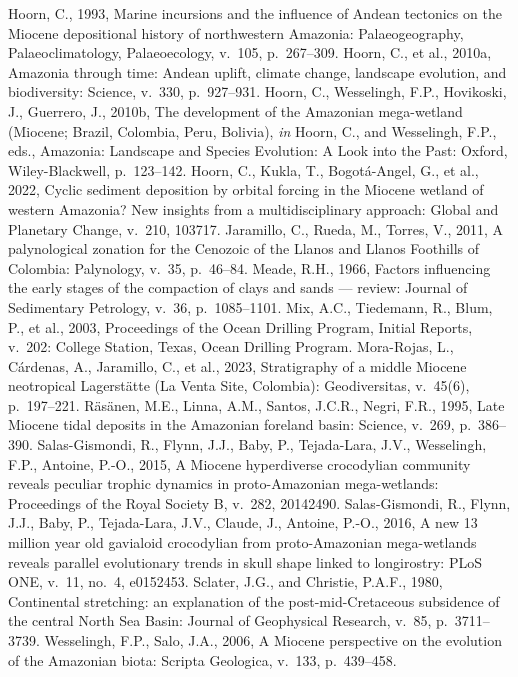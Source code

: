 \documentclass[12pt]{article}
\begin{document}
\begin{thebibliography}{}
 Hoorn, C., 1993, Marine incursions and the influence of
Andean tectonics on the Miocene depositional history of northwestern Amazonia:
Palaeogeography, Palaeoclimatology, Palaeoecology, v.~105, p.~267--309.
 Hoorn, C., et al., 2010a, Amazonia through time:
Andean uplift, climate change, landscape evolution, and biodiversity: Science, v.~330,
p.~927--931.
 Hoorn, C., Wesselingh, F.P., Hovikoski, J.,
Guerrero, J., 2010b, The development of the Amazonian mega-wetland (Miocene; Brazil,
Colombia, Peru, Bolivia), \textit{in} Hoorn, C., and Wesselingh, F.P., eds., Amazonia:
Landscape and Species Evolution: A Look into the Past: Oxford, Wiley-Blackwell, p.~123--142.
 Hoorn, C., Kukla, T., Bogot\'a-Angel, G., et al.,
2022, Cyclic sediment deposition by orbital forcing in the Miocene wetland of western
Amazonia? New insights from a multidisciplinary approach: Global and Planetary Change,
v.~210, 103717.
 Jaramillo, C., Rueda, M., Torres, V., 2011,
A palynological zonation for the Cenozoic of the Llanos and Llanos Foothills of Colombia:
Palynology, v.~35, p.~46--84.
 Meade, R.H., 1966, Factors influencing the early stages of
the compaction of clays and sands --- review: Journal of Sedimentary Petrology, v.~36,
p.~1085--1101.
 Mix, A.C., Tiedemann, R., Blum, P., et al., 2003,
Proceedings of the Ocean Drilling Program, Initial Reports, v.~202: College Station, Texas,
Ocean Drilling Program.
 Mora-Rojas, L., C\'ardenas, A., Jaramillo,
C., et al., 2023, Stratigraphy of a middle Miocene neotropical Lagerst\"atte (La Venta Site,
Colombia): Geodiversitas, v.~45(6), p.~197--221.
 R\"as\"anen, M.E., Linna, A.M., Santos,
J.C.R., Negri, F.R., 1995, Late Miocene tidal deposits in the Amazonian foreland basin:
Science, v.~269, p.~386--390.
 Salas-Gismondi, R., Flynn, J.J.,
Baby, P., Tejada-Lara, J.V., Wesselingh, F.P., Antoine, P.-O., 2015, A Miocene hyperdiverse
crocodylian community reveals peculiar trophic dynamics in proto-Amazonian mega-wetlands:
Proceedings of the Royal Society B, v.~282, 20142490.
 Salas-Gismondi, R., Flynn, J.J.,
Baby, P., Tejada-Lara, J.V., Claude, J., Antoine, P.-O., 2016, A new 13 million year old
gavialoid crocodylian from proto-Amazonian mega-wetlands reveals parallel evolutionary
trends in skull shape linked to longirostry: PLoS ONE, v.~11, no.~4, e0152453.
 Sclater, J.G., and Christie, P.A.F.,
1980, Continental stretching: an explanation of the post-mid-Cretaceous subsidence of the
central North Sea Basin: Journal of Geophysical Research, v.~85, p.~3711--3739.
 Wesselingh, F.P., Salo, J.A., 2006, A
Miocene perspective on the evolution of the Amazonian biota: Scripta Geologica, v.~133,
p.~439--458.
\end{thebibliography}
\end{document}

